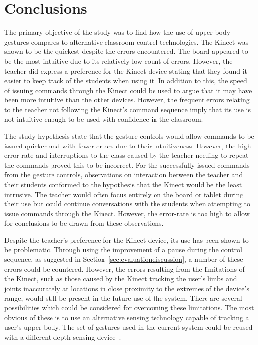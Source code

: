 \documentclass[manuscript, review, screen]{acmart}
\begin{document}

\section{Conclusions}
\label{sec:conclusions}

The primary objective of the study was to find how the use of upper-body gestures compares to alternative classroom control technologies.
The Kinect was shown to be the quickest despite the errors encountered.
The board appeared to be the most intuitive due to its relatively low count of errors.
However, the teacher did express a preference for the Kinect device stating that they found it easier to keep track of the students when using it.
In addition to this, the speed of issuing commands through the Kinect could be used to argue that it may have been more intuitive than the other devices.
However, the frequent errors relating to the teacher not following the Kinect's command sequence imply that its use is not intuitive enough to be used with confidence in the classroom.

The study hypothesis state that the gesture controls would allow commands to be issued quicker and with fewer errors due to their intuitiveness.
However, the high error rate and interruptions to the class caused by the teacher needing to repeat the commands proved this to be incorrect.
For the successfully issued commands from the gesture controls, observations on interaction between the teacher and their students conformed to the hypothesis that the Kinect would be the least intrusive.
The teacher would often focus entirely on the board or tablet during their use but could continue conversations with the students when attempting to issue commands through the Kinect.
However, the error-rate is too high to allow for conclusions to be drawn from these observations.

Despite the teacher's preference for the Kinect device, its use has been shown to be problematic.
Through using the improvement of a pause during the control sequence, as suggested in Section~\ref{sec:evaluationdiscussion}, a number of these errors could be countered.
However, the errors resulting from the limitations of the Kinect, such as those caused by the Kinect tracking the user's limbs and joints inaccurately at locations in close proximity to the extremes of the device's range, would still be present in the future use of the system.
There are several possibilities which could be considered for overcoming these limitations.
The most obvious of these is to use an alternative sensing technology capable of tracking a user's upper-body.
The set of gestures used in the current system could be reused with a different depth sensing device~\cite{Kean2011}.
\end{document}
